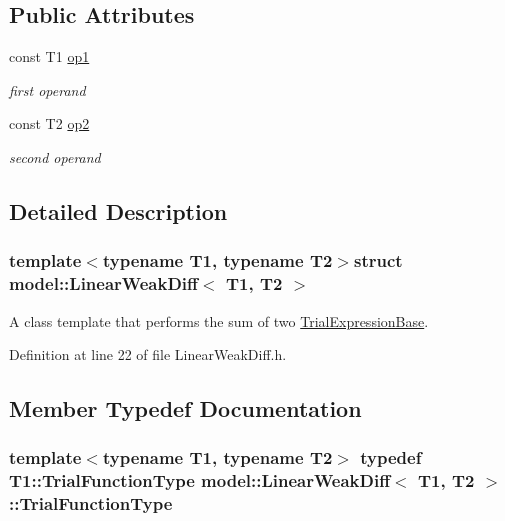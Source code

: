 \subsection*{Public Attributes}
\begin{DoxyCompactItemize}
\item 
const T1 \hyperlink{structmodel_1_1_linear_weak_diff_a4c5b37ae14b0f9d09f3999a186c4afbe}{op1}
\begin{DoxyCompactList}\small\item\em first operand \end{DoxyCompactList}\item 
const T2 \hyperlink{structmodel_1_1_linear_weak_diff_a38826dfbd3f9205c180335f6e480a166}{op2}
\begin{DoxyCompactList}\small\item\em second operand \end{DoxyCompactList}\end{DoxyCompactItemize}


\subsection{Detailed Description}
\subsubsection*{template$<$typename T1, typename T2$>$struct model\+::\+Linear\+Weak\+Diff$<$ T1, T2 $>$}

A class template that performs the sum of two \hyperlink{structmodel_1_1_trial_expression_base}{Trial\+Expression\+Base}. 

Definition at line 22 of file Linear\+Weak\+Diff.\+h.



\subsection{Member Typedef Documentation}
\hypertarget{structmodel_1_1_linear_weak_diff_aea0e41612eefdaad78e08842629e31a9}{}
\subsubsection[{Trial\+Function\+Type}]{\setlength{\rightskip}{0pt plus 5cm}template$<$typename T1, typename T2$>$ typedef T1\+::\+Trial\+Function\+Type {\bf model\+::\+Linear\+Weak\+Diff}$<$ T1, T2 $>$\+::{\bf Trial\+Function\+Type}}\label{structmodel_1_1_linear_weak_diff_aea0e41612eefdaad78e08842629e31a9}


